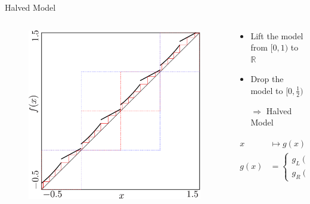 \begin{frame}{Halved Model}
	\vspace{-1em}
	\begin{columns}
		\begin{column}{.4 \textwidth}
			\begin{figure}
				\includegraphics[width=\textwidth]{Figs/archetypal_model_lifted.png}
			\end{figure}
		\end{column}
		\begin{column}{.5 \textwidth}
			\begin{itemize}
				\item Lift the model from $[0, 1)$ to $\mathbb{R}$
				\item Drop the model to $[0, \frac{1}{2})$
				\item[$\Rightarrow$] Halved Model
			\end{itemize}
			\begin{align*}
				x    & \mapsto g(x) \mod \frac{1}{2}                                              \\
				g(x) & = \begin{cases}
					         g_L(x) = a_L \cdot x^2 + b_L \cdot x + c_L & \text{ if } x < \frac{1}{4} \\
					         g_R(x) = b_R \cdot x + c_R                 & \text{ else}
				         \end{cases}
			\end{align*}
		\end{column}
	\end{columns}
\end{frame}

